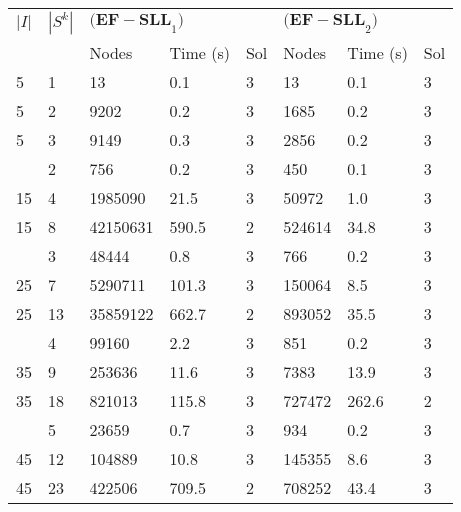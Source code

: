 
\begin{tabularx}{\textwidth}{ll *{6}{Y}}
    \toprule
    $|I|$ & $|S^k|$
        & & \\
    \cmidrule(lr){3-5} \cmidrule(lr){6-8}
    & & Nodes & Time (s) & Sol & Nodes & Time (s) & Sol\\
     & 1 & 13 & 0.1 & 3 & 13 & 0.1 & 3\\
    5 & 2 & 9202 & 0.2 & 3 & 1685 & 0.2 & 3\\
    5 & 3 & 9149 & 0.3 & 3 & 2856 & 0.2 & 3\\
     & 2 & 756 & 0.2 & 3 & 450 & 0.1 & 3\\
    15 & 4 & 1985090 & 21.5 & 3 & 50972 & 1.0 & 3\\
    15 & 8 & 42150631 & 590.5 & 2 & 524614 & 34.8 & 3\\
     & 3 & 48444 & 0.8 & 3 & 766 & 0.2 & 3\\
    25 & 7 & 5290711 & 101.3 & 3 & 150064 & 8.5 & 3\\
    25 & 13 & 35859122 & 662.7 & 2 & 893052 & 35.5 & 3\\
     & 4 & 99160 & 2.2 & 3 & 851 & 0.2 & 3\\
    35 & 9 & 253636 & 11.6 & 3 & 7383 & 13.9 & 3\\
    35 & 18 & 821013 & 115.8 & 3 & 727472 & 262.6 & 2\\
     & 5 & 23659 & 0.7 & 3 & 934 & 0.2 & 3\\
    45 & 12 & 104889 & 10.8 & 3 & 145355 & 8.6 & 3\\
    45 & 23 & 422506 & 709.5 & 2 & 708252 & 43.4 & 3\\
    \bottomrule
\end{tabularx}
